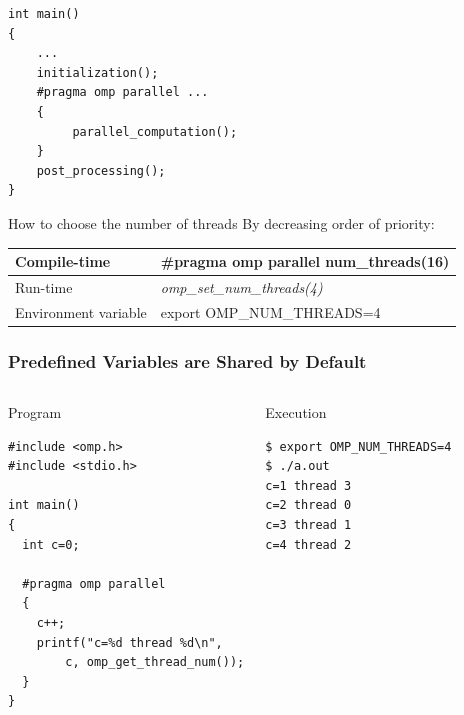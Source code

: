 \documentclass{beamer}
\begin{document}
\begin{frame}[fragile=singleslide]

\begin{verbatim}
int main()
{
    ...
    initialization();
    #pragma omp parallel ...
    {
         parallel_computation();
    }
    post_processing();
}
\end{verbatim}

\begin{exampleblock}{How to choose the number of threads}
By decreasing order of priority:

\small
\begin{tabular}[ht]{|l@{~:~}l|}
\hline
Compile-time &   \#pragma omp parallel num\_threads(16) \\
\hline
Run-time &  {\it omp\_set\_num\_threads(4)} \\
\hline
Environment variable &  export OMP\_NUM\_THREADS=4 \\
\hline
\end{tabular}
\normalsize
\end{exampleblock}
\end{frame}



\begin{frame}[fragile=singleslide]
  \frametitle{Predefined Variables are Shared by Default}
  
  \begin{columns}[t]
  \column{5cm}
\begin{block}{Program}
\begin{verbatim}
#include <omp.h>
#include <stdio.h>

int main()
{
  int c=0;

  #pragma omp parallel 
  {
    c++;
    printf("c=%d thread %d\n",
        c, omp_get_thread_num());
  }
}
\end{verbatim}
\end{block}
    
    
    \column{5cm}
\begin{block}{Execution}    
  \small

\begin{verbatim}
$ export OMP_NUM_THREADS=4
$ ./a.out
c=1 thread 3
c=2 thread 0
c=3 thread 1
c=4 thread 2
\end{verbatim}
\end{block}    
  \end{columns}
\end{frame}
\end{document}
